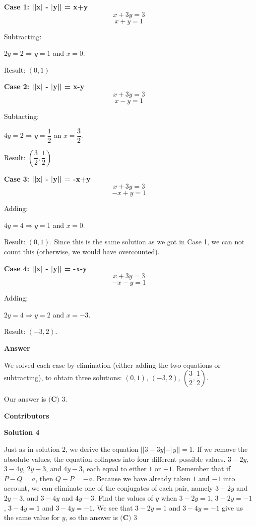 \begin{enumerate}
 \textbf{Case 1: ||x| - |y|| = x+y  }
 \[x+3y=3\]
 \[x+y=1\]

 Subtracting:

 $2y=2 \Rightarrow y=1$ and $x=0$.

 $\text{Result: } (0,1)$

 
\textbf{Case 2: ||x| - |y|| = x-y}
 \[x+3y=3\]
 \[x-y=1\]

 Subtacting:

 $4y=2 \Rightarrow y=\dfrac{1}{2}$ an $x=\dfrac{3}{2}$.

 $\text{Result: } \left(\dfrac{3}{2},\dfrac{1}{2}\right)$

 
\textbf{Case 3: ||x| - |y|| = -x+y}
 \[x+3y=3\]
 \[-x+y=1\]

 Adding: 

 $4y=4 \Rightarrow y=1$ and $x=0$.

 
$\text{Result: } (0,1)$. Since this is the same solution as we got in Case 1, we can not count this (otherwise, we would have overcounted).

 
\textbf{Case 4: ||x| - |y|| = -x-y}
 \[x+3y=3\]
 \[-x-y=1\]

 Adding: 

 $2y=4 \Rightarrow y=2$ and $x=-3$.

 
$\text{Result: } (-3,2)$.

 
\textbf{Answer}

 We solved each case by elimination (either adding the two equations or subtracting), to obtain three solutions: $(0, 1)$, $(-3,2)$, $\left(\dfrac{3}{2}, \dfrac{1}{2}\right)$.

 Our answer is $\boxed{\textbf{(C) } 3}$.

 
\textbf{Contributors}

 



\textbf{Solution 4}

Just as in solution $2$, we derive the equation $||3-3y|-|y||=1$. If we remove the absolute values, the equation collapses into four different possible values. $3-2y$, $3-4y$, $2y-3$, and $4y-3$, each equal to either $1$ or $-1$. Remember that if $P-Q=a$, then $Q-P=-a$. Because we have already taken $1$ and $-1$ into account, we can eliminate one of the conjugates of each pair, namely $3-2y$ and $2y-3$, and $3-4y$ and $4y-3$. Find the values of $y$ when $3-2y=1$, $3-2y=-1$, $3-4y=1$ and $3-4y=-1$. We see that $3-2y=1$ and $3-4y=-1$ give us the same value for $y$, so the answer is $\boxed{\textbf{(C) } 3}$





\end{enumerate}
